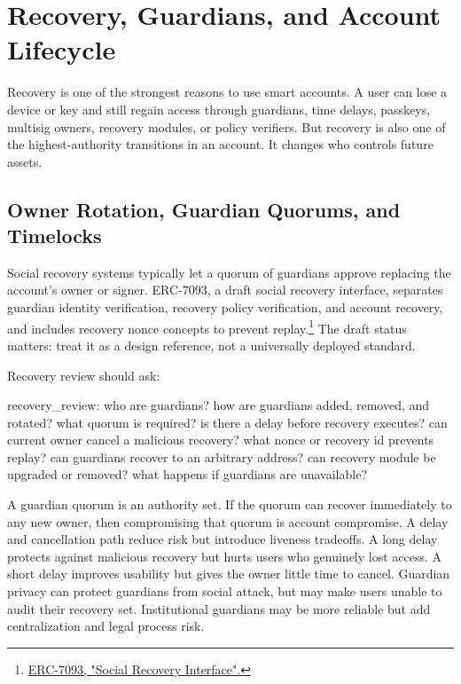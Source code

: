 \section{Recovery, Guardians, and Account Lifecycle}

Recovery is one of the strongest reasons to use smart accounts. A user can lose a device or key and still regain access through guardians, time delays, passkeys, multisig owners, recovery modules, or policy verifiers. But recovery is also one of the highest-authority transitions in an account. It changes who controls future assets.

\subsection{Owner Rotation, Guardian Quorums, and Timelocks}

Social recovery systems typically let a quorum of guardians approve replacing the account's owner or signer. ERC-7093, a draft social recovery interface, separates guardian identity verification, recovery policy verification, and account recovery, and includes recovery nonce concepts to prevent replay.\footnote{\href{https://eips.ethereum.org/EIPS/eip-7093}{ERC-7093, "Social Recovery Interface".}} The draft status matters: treat it as a design reference, not a universally deployed standard.

Recovery review should ask:

\begin{codeblock}
recovery_review:
    who are guardians?
    how are guardians added, removed, and rotated?
    what quorum is required?
    is there a delay before recovery executes?
    can current owner cancel a malicious recovery?
    what nonce or recovery id prevents replay?
    can guardians recover to an arbitrary address?
    can recovery module be upgraded or removed?
    what happens if guardians are unavailable?
\end{codeblock}

A guardian quorum is an authority set. If the quorum can recover immediately to any new owner, then compromising that quorum is account compromise. A delay and cancellation path reduce risk but introduce liveness tradeoffs. A long delay protects against malicious recovery but hurts users who genuinely lost access. A short delay improves usability but gives the owner little time to cancel. Guardian privacy can protect guardians from social attack, but may make users unable to audit their recovery set. Institutional guardians may be more reliable but add centralization and legal process risk.

